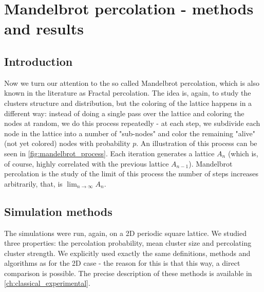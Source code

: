 \chapter{Mandelbrot percolation - methods and results}
\label{ch:mandelbrot_experimental}

\section{Introduction}

Now we turn our attention to the so called Mandelbrot percolation, which is also known in the literature as Fractal percolation. The idea is, again, to study the clusters structure and distribution, but the coloring of the lattice happens in a different way: instead of doing a single pass over the lattice and coloring the nodes at random, we do this process repeatedly - at each step, we subdivide each node in the lattice into a number of "sub-nodes" and color the remaining "alive" (not yet colored) nodes with probability $p$. An illustration of this process can be seen in \autoref{fig:mandelbrot_process}. 
Each iteration generates a lattice $A_n$ (which is, of course, highly correlated with the previous lattice $A_{n-1}$). Mandelbrot percolation is the study of the limit of this process the number of steps increases arbitrarily, that, is $\lim_{n\to\infty} A_n$.

\section{Simulation methods}

The simulations were run, again, on a 2D periodic square lattice. 
We studied three properties: the percolation probability, mean cluster size and percolating cluster strength. We explicitly used exactly the same definitions, methods and algorithms as for the 2D case - the reason for this is that this way, a direct comparison is possible. The precise description of these methods is available in \autoref{ch:classical_experimental}.




